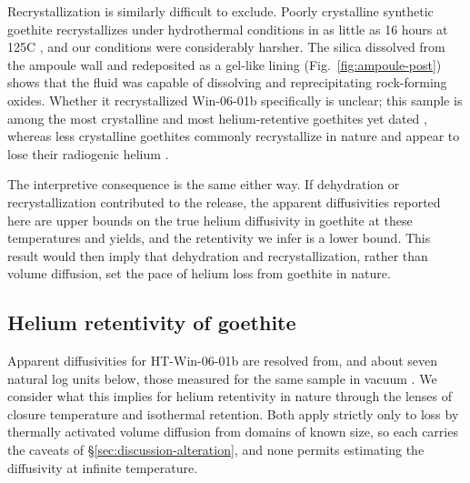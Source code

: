 Recrystallization is similarly difficult to exclude. Poorly crystalline synthetic goethite recrystallizes under hydrothermal conditions in as little as 16 hours at 125\textdegree C \citep{schwertmann1985}, and our conditions were considerably harsher. The silica dissolved from the ampoule wall and redeposited as a gel-like lining (Fig.~\ref{fig:ampoule-post}) shows that the fluid was capable of dissolving and reprecipitating rock-forming oxides. Whether it recrystallized Win-06-01b specifically is unclear; this sample is among the most crystalline and most helium-retentive goethites yet dated \citep{waltenberg2012,farley2024}, whereas less crystalline goethites commonly recrystallize in nature and appear to lose their radiogenic helium \citep{monteiro2018,monteiro2014,heim2006}.

The interpretive consequence is the same either way. If dehydration or recrystallization contributed to the release, the apparent diffusivities reported here are upper bounds on the true helium diffusivity in goethite at these temperatures and yields, and the retentivity we infer is a lower bound. This result would then imply that dehydration and recrystallization, rather than volume diffusion, set the pace of helium loss from goethite in nature.

\subsection{Helium retentivity of goethite}\label{sec:discussion-retentivity}

Apparent diffusivities for HT-Win-06-01b are resolved from, and about seven natural log units below, those measured for the same sample in vacuum \citep{monteiro2017,farley2024}. We consider what this implies for helium retentivity in nature through the lenses of closure temperature and isothermal retention. Both apply strictly only to loss by thermally activated volume diffusion from domains of known size, so each carries the caveats of \S\ref{sec:discussion-alteration}, and none permits estimating the diffusivity at infinite temperature.

